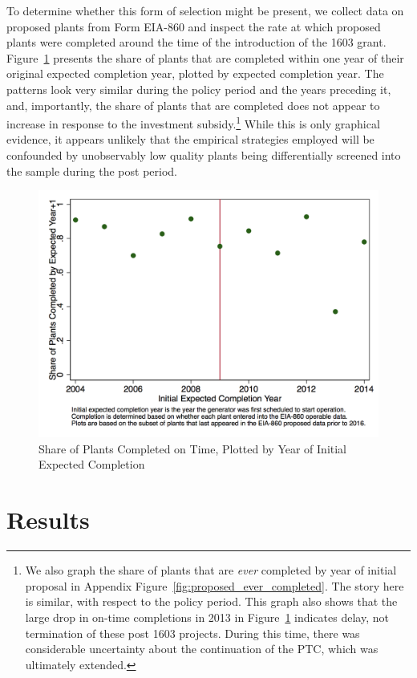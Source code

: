 \documentclass[12pt]{article}
\begin{document}
To determine whether this form of selection might be present, we collect data on proposed plants from Form EIA-860 and inspect the rate at which proposed plants were completed around the time of the introduction of the 1603 grant. Figure~\ref{fig:proposed_completed_on_time} presents the share of plants that are completed within one year of their original expected completion year, plotted by expected completion year. The patterns look very similar during the policy period and the years preceding it, and, importantly, the share of plants that are completed does not appear to increase in response to the investment subsidy.\footnote{We also graph the share of plants that are \textit{ever} completed by year of initial proposal in Appendix Figure~\ref{fig:proposed_ever_completed}. The story here is similar, with respect to the policy period. This graph also shows that the large drop in on-time completions in 2013 in Figure~\ref{fig:proposed_completed_on_time} indicates delay, not termination of these post 1603 projects. During this time, there was considerable uncertainty about the continuation of the PTC, which was ultimately extended.} While this is only graphical evidence, it appears unlikely that the empirical strategies employed will be confounded by unobservably low quality plants being differentially screened into the sample during the post period. 

\begin{figure}[h] \centering
\caption{Share of Plants Completed on Time, Plotted by Year of Initial Expected Completion\label{fig:proposed_completed_on_time}}
\includegraphics[width=0.75\linewidth]{../output/figures/proposal_data_completed_on_time.png}
\end{figure}


\section{Results \label{sec:results}}
\end{document}
